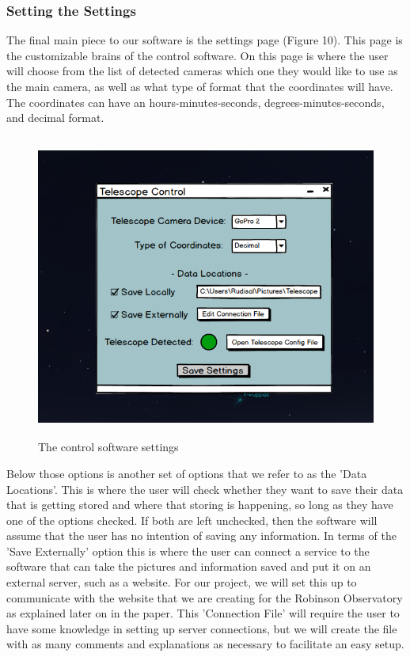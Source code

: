 \documentclass[12pt]{report}
\begin{document}
\newpage

\subsubsection*{Setting the Settings}

The final main piece to our software is the settings page (Figure 10). This page is the customizable brains of the control software. On this page is where the user will choose from the list of detected cameras which one they would like to use as the main camera, as well as what type of format that the coordinates will have. The coordinates can have an hours-minutes-seconds, degrees-minutes-seconds, and decimal format.

\begin{figure}[h]
	\centering
	\includegraphics[width=0.75\linewidth, height=10.0cm]{Settings}
	\caption{The control software settings}
\end{figure}



Below those options is another set of options that we refer to as the 'Data Locations'. This is where the user will check whether they want to save their data that is getting stored and where that storing is happening, so long as they have one of the options checked. If both are left unchecked, then the software will assume that the user has no intention of saving any information. In terms of the 'Save Externally' option this is where the user can connect a service to the software that can take the pictures and information saved and put it on an external server, such as a website. For our project, we will set this up to communicate with the website that we are creating for the Robinson Observatory as explained later on in the paper. This 'Connection File' will require the user to have some knowledge in setting up server connections, but we will create the file with as many comments and explanations as necessary to facilitate an easy setup.
\end{document}
